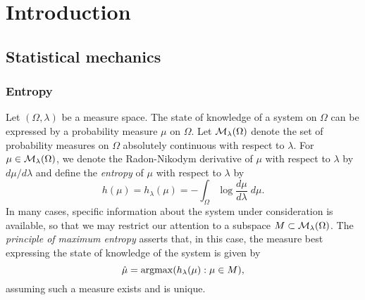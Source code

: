 
\chapter{Introduction}


\section{Statistical mechanics}


\subsection{Entropy}

Let $(\Omega, \lambda)$ be a measure space. The state of knowledge of a system on $\Omega$ can be expressed by a probability measure $\mu$ on $\Omega$. Let
$\mathcal{M}_\lambda(\Omega)$ denote the set of probability measures on $\Omega$ absolutely continuous with respect to $\lambda$. For
$\mu \in \mathcal{M}_\lambda(\Omega)$, we denote the Radon-Nikodym derivative of
$\mu$ with respect to $\lambda$ by $d\mu/d\lambda$ and define the
\emph{entropy} of $\mu$ with respect to $\lambda$ by
\begin{equation}
h(\mu) = h_\lambda(\mu) = -\int_\Omega \log\frac{d\mu}{d\lambda} \; d\mu.
\end{equation}
In many cases, specific information about the system under consideration is available, so that we may restrict our attention to a subspace $M \subset \mathcal{M}_\lambda(\Omega)$.
The \emph{principle of maximum entropy} \cite{Jaynes57} asserts that, in this
case, the measure best expressing the state of knowledge of the system is given by
\begin{equation}
\hat\mu = \operatorname*{argmax}(h_\lambda(\mu) : \mu \in M),
\end{equation}
assuming such a measure exists and is unique.

